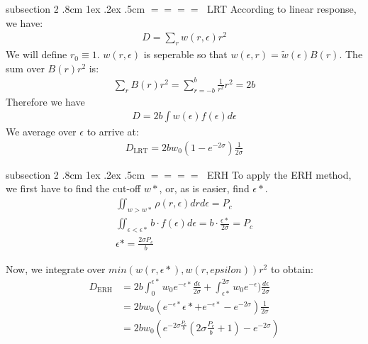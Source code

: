 \documentclass[onecolumn,fleqn,notitlepage,secnumarabic]{revtex4}
\makeatletter
\def\subsection{%
  \@startsection
    {subsection}%
    {2}%
    {\z@}%
    {.8cm \@plus1ex \@minus .2ex}%
    {.5cm}%
    {\normalfont\small\bfseries$=\!=\!=\!=\;$}%
}%
\makeatother
\begin{document}
\subsection{LRT}
According to linear response, we have:
\begin{align}
   D= \sum_r w(r,\epsilon)r^2
\end{align}
We will define $r_0\equiv 1$. $w(r,\epsilon)$ is seperable so that $w(\epsilon,r) = \tilde{w}(\epsilon)B(r)$.
The sum over $B(r)r^2$ is:
\begin{align}
  \sum_r B(r)r^2 = \sum_{r=-b}^b \frac{1}{r^2}r^2 = 2b
\end{align}
Therefore we have
\begin{align}
   D= 2b\int w(\epsilon)f(\epsilon)d\epsilon
\end{align}
We average over $\epsilon$ to arrive at:
\begin{align}
   D_\text{LRT} = 2 b w_0\left(1-e^{-2\sigma}\right)\frac{1}{2\sigma}
\end{align}

\subsection{ERH}
To apply the ERH method, we first have to find the cut-off $w*$, or, as is easier, find $\epsilon*$.
\begin{align}
\iint_{w>w*} \rho(r,\epsilon) dr d\epsilon = P_c \\
\iint_{\epsilon<\epsilon*} b\cdot f(\epsilon) d\epsilon = b\cdot\frac{\epsilon*}{2\sigma} = P_c\\
\epsilon* = \frac{2\sigma P_c}{b}
\end{align}

Now, we integrate over $min(w(r,\epsilon*),w(r,epsilon))r^2$ to obtain:
\begin{align}
   D_\textrm{ERH} &= 2b\int_0^{\epsilon*}w_0e^{-\epsilon*}\frac{d\epsilon}{2\sigma} +  \int_{\epsilon*}^{2\sigma} w_0e^{-\epsilon})\frac{d\epsilon}{2\sigma} \\
   &= 2b w_0\left(e^{-\epsilon*}\epsilon*+e^{-\epsilon*}-e^{-2\sigma}\right)\frac{1}{2\sigma}\\
   &= 2b w_0 \left( e^{-2\sigma\frac{P_c}{b}}\left(2\sigma\frac{P_c}{b} + 1\right) - e^{-2\sigma}\right)
\end{align}





%

\end{document}
